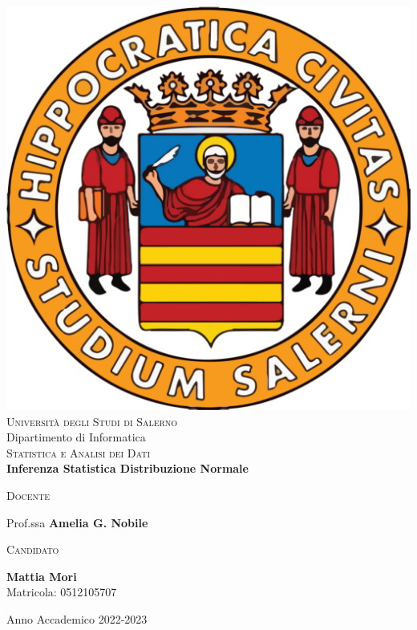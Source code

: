\begin{titlepage}
\changepage{}{}{}{}{}{}{}{}{}


\begin{center}
\includegraphics [width=.15\columnwidth, angle=0]{capitoli/images/unisa.pdf}\\ %
\vspace{0.5cm}
{\LARGE \scshape Università degli Studi di Salerno}\\
\vspace{1cm}
{\Large Dipartimento di Informatica}\\
\vspace{2cm}
{\Large \scshape Statistica e Analisi dei Dati} \\
\vspace{2cm}
{\huge \bfseries Inferenza Statistica Distribuzione Normale} \\
\vspace{6cm}

\begin{minipage}[t]{7cm}
\flushleft
\textsc{Docente}

Prof.ssa \textbf{Amelia G. Nobile} \\[0.25cm]

\end{minipage}
\hfill
\begin{minipage}[t]{7cm}
\flushright
\textsc{Candidato}

\textbf{Mattia Mori} \\
Matricola: 0512105707
\end{minipage}

\vspace{2cm}

{\small Anno Accademico 2022-2023} %

\end{center}

\end{titlepage}